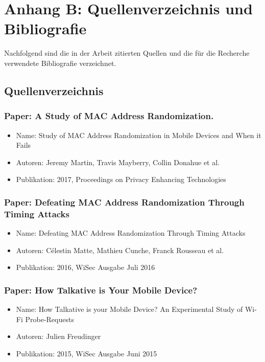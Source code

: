 \chapter{Anhang B: Quellenverzeichnis und Bibliografie}
Nachfolgend sind die in der Arbeit zitierten Quellen und die für die Recherche 
verwendete Bibliografie verzeichnet.

\clearpage

\section*{Quellenverzeichnis}

\subsection*{Paper: A Study of MAC Address Randomization.}
\begin{itemize}
    \item Name: Study of MAC Address Randomization in Mobile Devices and 
    When it Fails
    \item Autoren: Jeremy Martin, Travis Mayberry, Collin Donahue et al.
    \item Publikation: 2017, Proceedings on Privacy Enhancing Technologies 
\end{itemize}

\subsection*{Paper: Defeating MAC Address Randomization Through Timing Attacks}
\begin{itemize}
    \item Name: Defeating MAC Address Randomization Through Timing Attacks
    \item Autoren: Célestin Matte, Mathieu Cunche, Franck Rousseau et al.
    \item Publikation: 2016, WiSec Ausgabe Juli 2016
\end{itemize}

\subsection*{Paper: How Talkative is Your Mobile Device?}
\begin{itemize}
    \item Name: How Talkative is your Mobile Device? An Experimental Study of Wi-Fi 
    Probe-Requests
    \item Autoren: Julien Freudinger
    \item Publikation: 2015, WiSec Ausgabe Juni 2015
\end{itemize}

